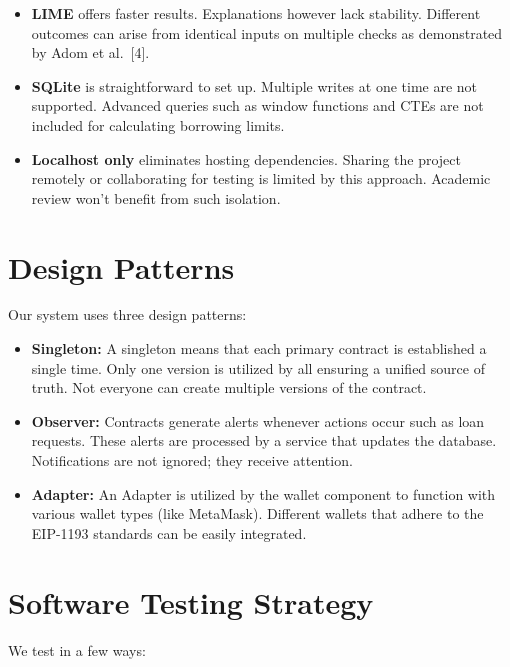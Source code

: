 \documentclass[12pt,a4paper]{report}
\begin{document}
\begin{itemize}[noitemsep]
\item \textbf{LIME} offers faster results. Explanations however lack stability. Different outcomes can arise from identical inputs on multiple checks as demonstrated by Adom et al.~[4].

\item \textbf{SQLite} is straightforward to set up. Multiple writes at one time are not supported. Advanced queries such as window functions and CTEs are not included for calculating borrowing limits.

\item \textbf{Localhost only} eliminates hosting dependencies. Sharing the project remotely or collaborating for testing is limited by this approach. Academic review won't benefit from such isolation.
\end{itemize}


\section{Design Patterns}

Our system uses three design patterns:

\begin{itemize}[noitemsep]
\item \textbf{Singleton:} A singleton means that each primary contract is established a single time. Only one version is utilized by all ensuring a unified source of truth. Not everyone can create multiple versions of the contract.

\item \textbf{Observer:} Contracts generate alerts whenever actions occur such as loan requests. These alerts are processed by a service that updates the database. Notifications are not ignored; they receive attention.

\item \textbf{Adapter:} An Adapter is utilized by the wallet component to function with various wallet types (like MetaMask). Different wallets that adhere to the EIP-1193 standards can be easily integrated.
\end{itemize}


\section{Software Testing Strategy}

We test in a few ways:
\end{document}
